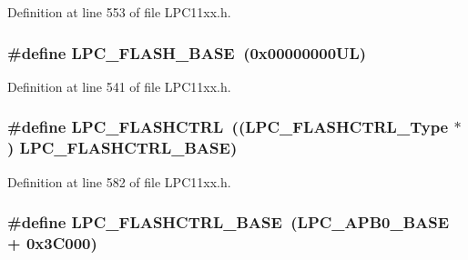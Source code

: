 Definition at line 553 of file L\+P\+C11xx.\+h.

\subsubsection[{\texorpdfstring{L\+P\+C\+\_\+\+F\+L\+A\+S\+H\+\_\+\+B\+A\+SE}{LPC_FLASH_BASE}}]{\setlength{\rightskip}{0pt plus 5cm}\#define L\+P\+C\+\_\+\+F\+L\+A\+S\+H\+\_\+\+B\+A\+SE~(0x00000000\+U\+L)}\hypertarget{group___l_p_c11xx___definitions_ga7d7417b6cd6c6975fa03de03920d27e8}{}\label{group___l_p_c11xx___definitions_ga7d7417b6cd6c6975fa03de03920d27e8}


Definition at line 541 of file L\+P\+C11xx.\+h.

\subsubsection[{\texorpdfstring{L\+P\+C\+\_\+\+F\+L\+A\+S\+H\+C\+T\+RL}{LPC_FLASHCTRL}}]{\setlength{\rightskip}{0pt plus 5cm}\#define L\+P\+C\+\_\+\+F\+L\+A\+S\+H\+C\+T\+RL~(({\bf L\+P\+C\+\_\+\+F\+L\+A\+S\+H\+C\+T\+R\+L\+\_\+\+Type} $\ast$) {\bf L\+P\+C\+\_\+\+F\+L\+A\+S\+H\+C\+T\+R\+L\+\_\+\+B\+A\+SE})}\hypertarget{group___l_p_c11xx___definitions_ga0e5b0ed0e4ad1155df98372c932e8bc7}{}\label{group___l_p_c11xx___definitions_ga0e5b0ed0e4ad1155df98372c932e8bc7}


Definition at line 582 of file L\+P\+C11xx.\+h.

\subsubsection[{\texorpdfstring{L\+P\+C\+\_\+\+F\+L\+A\+S\+H\+C\+T\+R\+L\+\_\+\+B\+A\+SE}{LPC_FLASHCTRL_BASE}}]{\setlength{\rightskip}{0pt plus 5cm}\#define L\+P\+C\+\_\+\+F\+L\+A\+S\+H\+C\+T\+R\+L\+\_\+\+B\+A\+SE~({\bf L\+P\+C\+\_\+\+A\+P\+B0\+\_\+\+B\+A\+SE} + 0x3\+C000)}\hypertarget{group___l_p_c11xx___definitions_gad8bd09a830e15ea80293576f61deeccd}{}\label{group___l_p_c11xx___definitions_gad8bd09a830e15ea80293576f61deeccd}


